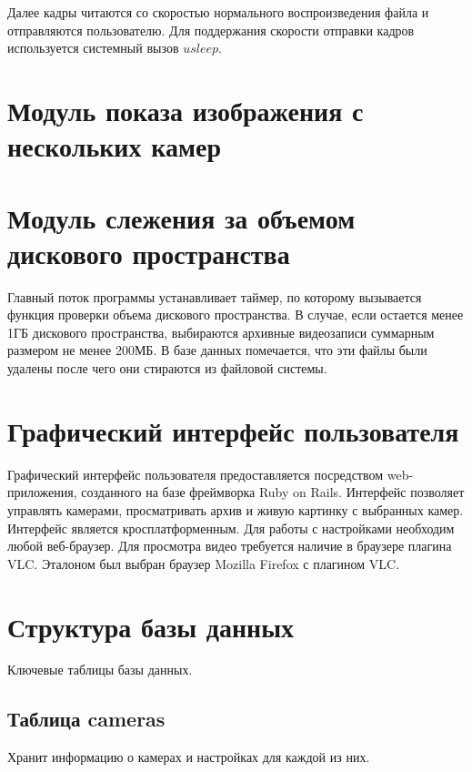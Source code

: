 Далее кадры читаются со скоростью нормального воспроизведения файла и отправляются пользователю.
Для поддержания скорости отправки кадров используется системный вызов $usleep$.

\section{Модуль показа изображения с нескольких камер}

\section{Модуль слежения за объемом дискового пространства}
Главный поток программы устанавливает таймер, по которому вызывается функция проверки объема дискового
пространства. В случае, если остается менее 1ГБ дискового пространства, выбираются архивные видеозаписи
суммарным размером не менее 200МБ. В базе данных помечается, что эти файлы были удалены после чего они
стираются из файловой системы.

\section{Графический интерфейс пользователя}
Графический интерфейс пользователя предоставляется посредством web-приложения, созданного на базе
фреймворка Ruby on Rails. Интерфейс позволяет управлять камерами, просматривать архив и
живую картинку с выбранных камер. Интерфейс является кросплатформенным. Для работы с настройками
необходим любой веб-браузер. Для просмотра видео требуется наличие в браузере плагина VLC.
Эталоном был выбран браузер Mozilla Firefox с плагином VLC.

\section{Структура базы данных }
Ключевые таблицы базы данных.

\subsection{Таблица cameras}
Хранит информацию о камерах и настройках для каждой из них.

